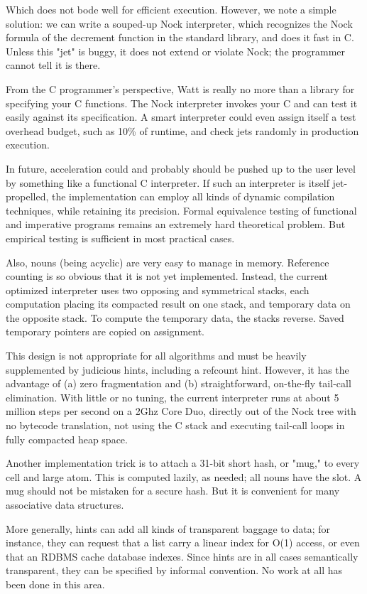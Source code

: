 \documentclass[10pt, nocopyrightspace]{sigplanconf}
\begin{document}
Which does not bode well for efficient execution.  However, we
note a simple solution: we can write a souped-up Nock
interpreter, which recognizes the Nock formula of the decrement
function in the standard library, and does it fast in C.  Unless
this "jet" is buggy, it does not extend or violate Nock; the 
programmer cannot tell it is there.  

From the C programmer's perspective, Watt is really no more than
a library for specifying your C functions.  The Nock interpreter
invokes your C and can test it easily against its specification.
A smart interpreter could even assign itself a test overhead
budget, such as 10\% of runtime, and check jets randomly in
production execution.

In future, acceleration could and probably should be pushed up to
the user level by something like a functional C interpreter.  If
such an interpreter is itself jet-propelled, the implementation
can employ all kinds of dynamic compilation techniques, while
retaining its precision.  Formal equivalence testing of
functional and imperative programs remains an extremely hard
theoretical problem.  But empirical testing is sufficient in most
practical cases.

Also, nouns (being acyclic) are very easy to manage in memory.
Reference counting is so obvious that it is not yet implemented.
Instead, the current optimized interpreter uses two opposing
and symmetrical stacks, each computation placing its compacted
result on one stack, and temporary data on the opposite stack.
To compute the temporary data, the stacks reverse.  Saved
temporary pointers are copied on assignment.

This design is not appropriate for all algorithms and must be
heavily supplemented by judicious hints, including a refcount
hint.  However, it has the advantage of (a) zero fragmentation
and (b) straightforward, on-the-fly tail-call elimination.  With
little or no tuning, the current interpreter runs at about 5
million steps per second on a 2Ghz Core Duo, directly out of the
Nock tree with no bytecode translation, not using the C stack and
executing tail-call loops in fully compacted heap space.

Another implementation trick is to attach a 31-bit short hash, or
"mug," to every cell and large atom.  This is computed lazily, as
needed; all nouns have the slot.  A mug should not be mistaken
for a secure hash.  But it is convenient for many associative
data structures.

More generally, hints can add all kinds of transparent baggage to
data; for instance, they can request that a list carry a linear
index for O(1) access, or even that an RDBMS cache database
indexes.  Since hints are in all cases semantically transparent,
they can be specified by informal convention.  No work at all has
been done in this area.
\end{document}
